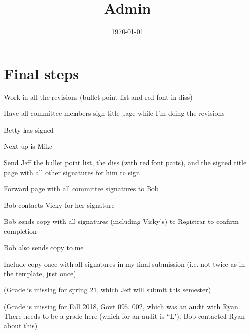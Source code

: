 \documentclass[12pt]{article}
\title{Admin}
\date{\today}
\begin{document}
\maketitle

\section*{Final steps}
	\begin{coi}
		\item Work in all the revisions (bullet point list and red font in diss)
		\item Have all committee members sign title page while I'm doing the revisions
			\begin{coi}
				\item Betty has signed
				\item Next up is Mike
			\end{coi}
		\item Send Jeff the bullet point list, the diss (with red font parts), and the signed title page with all other signatures for him to sign
		\item Forward page with all committee signatures to Bob
		\item Bob contacts Vicky for her signature
		\item Bob sends copy with all signatures (including Vicky's) to Registrar to confirm completion
		\item Bob also sends copy to me
		\item Include copy once with all signatures in my final submission (i.e. not twice as in the template, just once)
		\item (Grade is missing for spring 21, which Jeff will submit this semester)
		\item (Grade is missing for Fall 2018, Govt 096. 002, which was an audit with Ryan. There needs to be a grade here (which for an audit is ``L"). Bob contacted Ryan about this)


	\end{coi}

 
\end{document}
